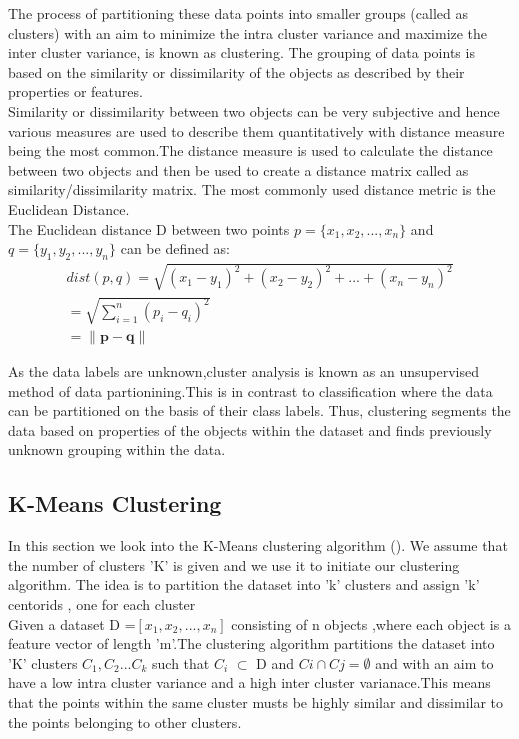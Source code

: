 The process of partitioning these data points into smaller groups (called as clusters) with an aim to minimize the intra cluster variance and maximize the inter cluster variance, is known as clustering. The grouping of data points is based on the similarity or dissimilarity of the objects as described by their properties or features.\\

Similarity or dissimilarity between two objects can be very subjective and hence various measures are used to describe them quantitatively with distance measure being the most common.The distance measure is used to calculate the distance between two objects and then be used to create a distance matrix called as similarity/dissimilarity matrix. The most commonly used distance metric is the Euclidean Distance.\\

The Euclidean distance D between two points $p =\{x_1, x_2, ... , x_n\}$ and $q =\{y_1, y_2, ... , y_n\}$ can be defined as:
\begin{equation}\label{eq: Euclidean dist}
\begin{split}
dist(p,q) =  \sqrt{(x_1 - y_1)^2 + (x_2 - y_2)^2 + ... +(x_n - y_n)^2 } \\
=  \sqrt{\sum_{i=1}^{n}(p_i - q_i)^2} \\
= \lVert \mathbf{p-q} \rVert
\end{split}
\end{equation}

As the data labels are unknown,cluster analysis is known as an unsupervised method of data partionining.This is in contrast to classification where the data can be partitioned on the basis of their class labels. Thus, clustering segments the data based on properties of the objects within the dataset and finds previously unknown grouping within the data.

\subsection{K-Means Clustering}\label{sec:kmeans}
In this section we look into the K-Means clustering algorithm (\citet{macqueen1967some}). We assume that the number of clusters 'K' is given and we use it to initiate our clustering algorithm. The idea is to partition the dataset into 'k' clusters and assign 'k' centorids , one for each cluster \\

Given a dataset D =$[x_1,x_2,...,x_n]$ consisting of n objects ,where each object is a feature vector of length 'm'.The clustering algorithm partitions the dataset into 'K' clusters $C_1,C_2...C_k$ such that $C_i$ $\subset$ D and $Ci \cap Cj = \emptyset$ and with an aim to have a low intra cluster variance and a high inter cluster varianace.This means that the points within the same cluster musts be highly similar and dissimilar to the points belonging to other clusters.\\

